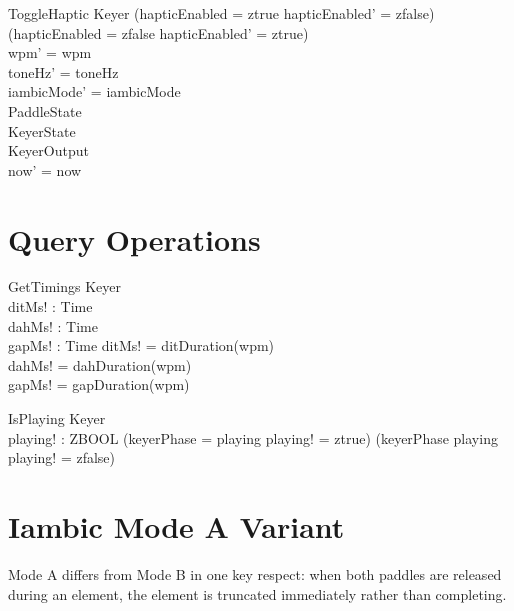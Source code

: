 \documentclass[a4paper,10pt,fleqn]{article}
\begin{document}
\begin{schema}{ToggleHaptic}
\Delta Keyer
\where
(hapticEnabled = ztrue \land hapticEnabled' = zfalse) \lor
(hapticEnabled = zfalse \land hapticEnabled' = ztrue) \\
wpm' = wpm \\
toneHz' = toneHz \\
iambicMode' = iambicMode \\
\Xi PaddleState \\
\Xi KeyerState \\
\Xi KeyerOutput \\
now' = now
\end{schema}

\section{Query Operations}

\begin{schema}{GetTimings}
\Xi Keyer \\
ditMs! : Time \\
dahMs! : Time \\
gapMs! : Time
\where
ditMs! = ditDuration(wpm) \\
dahMs! = dahDuration(wpm) \\
gapMs! = gapDuration(wpm)
\end{schema}

\begin{schema}{IsPlaying}
\Xi Keyer \\
playing! : ZBOOL
\where
(keyerPhase = playing \land playing! = ztrue) \lor
(keyerPhase \neq playing \land playing! = zfalse)
\end{schema}

\section{Iambic Mode A Variant}
\label{sec:modea}

Mode A differs from Mode B in one key respect: when both paddles are released
during an element, the element is truncated immediately rather than completing.
\end{document}
